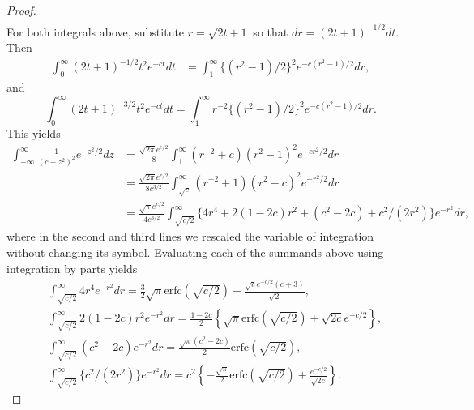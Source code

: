 \documentclass[10pt,a4paper]{amsart}
\begin{document}
\begin{proof}
\begin{equation*}
\begin{aligned}
    \end{aligned}
\end{equation*}
For both integrals above, substitute $r = \sqrt{2t+1}$ so that $dr = (2t+1)^{-1/2} dt$. Then
\begin{equation*}
\begin{aligned}
    \int_0^\infty (2t+1)^{-1/2}t^2 e^{-ct} dt &= \int_1^\infty \{(r^2-1)/2\}^2 e^{-c (r^2-1)/2} dr, 
\end{aligned}
\end{equation*}
and
\begin{equation*}
    \int_0^\infty (2t+1)^{-3/2}t^2 e^{-ct} dt = \int_1^\infty r^{-2} \{(r^2-1)/2\}^2 e^{-c(r^2-1)/2} dr.
\end{equation*}
This yields
\begin{equation*}
    \begin{aligned}
        \int_{-\infty}^\infty \frac{1}{(c + z^2)^{2}}e^{-z^2/2} dz &= \frac{\sqrt{2\pi} e^{c/2}}{8}\int_1^\infty (r^{-2}+c) (r^2-1)^2 e^{-cr^2/2} dr \\
        &= \frac{\sqrt{2\pi} e^{c/2}}{8 c^{3/2}}\int_{\sqrt{c}}^\infty (r^{-2}+1) (r^2-c)^2 e^{-r^2/2} dr \\
        &= \frac{\sqrt{\pi} e^{c/2}}{4 c^{3/2}}\int_{\sqrt{c/2}}^\infty \{4 r^4 + 2(1- 2c)r^2+ (c^2 - 2c) + c^2/(2r^2)\} e^{-r^2} dr ,
    \end{aligned}
\end{equation*}
where in the second and third lines we rescaled the variable of integration without changing its symbol. Evaluating each of the summands above using integration by parts yields
\begin{equation*}
\begin{aligned}
        &\int_{\sqrt{c/2}}^\infty 4 r^4 e^{-r^2} dr = \frac{3}{2}\sqrt{\pi} \mathrm{erfc}(\sqrt{c/2}) + \frac{\sqrt{c}e^{-c/2}(c+3)}{\sqrt{2}},\\
        &\int_{\sqrt{c/2}}^\infty 2(1-2c) r^2 e^{-r^2} dr = \frac{1-2c}{2}\left\{\sqrt{\pi} \mathrm{erfc}(\sqrt{c/2}) + \sqrt{2c} e^{-c/2} \right\},\\
        &\int_{\sqrt{c/2}}^\infty (c^2 - 2c) e^{-r^2} dr = \frac{\sqrt{\pi}(c^2-2c)}{2} \mathrm{erfc}(\sqrt{c/2}),\\
        &\int_{\sqrt{c/2}}^\infty \{c^2/(2r^2)\} e^{-r^2} dr = c^2 \left\{-\frac{\sqrt{\pi}}{2} \mathrm{erfc}(\sqrt{c/2}) + \frac{e^{-c/2}}{\sqrt{2c}}\right\}.
\end{aligned}
\end{equation*}
    

\end{proof}
\end{document}
